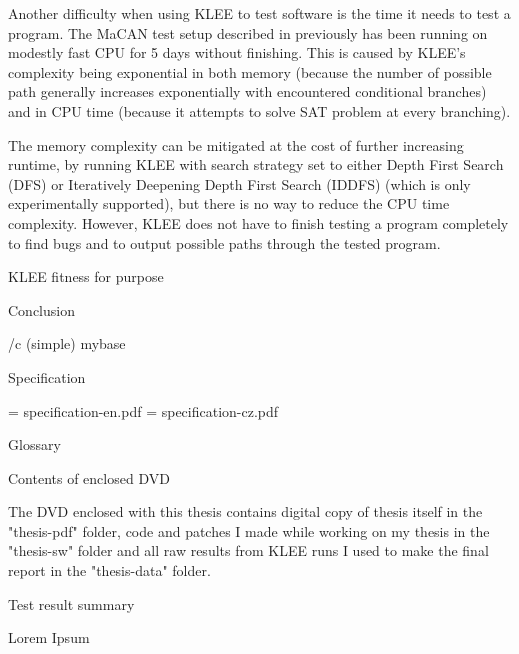 Another difficulty when using KLEE to test software is the time it needs to
test a program. The MaCAN test setup described in previously has been running
on modestly fast CPU for 5 days without finishing. This is caused by KLEE's
complexity being exponential in both memory (because the number of possible
path generally increases exponentially with encountered conditional branches)
and in CPU time (because it attempts to solve SAT problem at every branching).

The memory complexity can be mitigated at the cost of further increasing
runtime, by running KLEE with search strategy set to either Depth First Search
(DFS) or Iteratively Deepening Depth First Search (IDDFS) (which is only
experimentally supported), but there is no way to reduce the CPU time
complexity. However, KLEE does not have to finish testing a program completely
to find bugs and to output possible paths through the tested program.



\sec KLEE fitness for purpose




\chap Conclusion



\bibchap
\usebib/c (simple) mybase


\app Specification

\picw=\hsize
\cinspic specification-en.pdf
\vskip-2cm
\vfil\break
\picw=\hsize
\cinspic specification-cz.pdf
\nextoddpage


\app Glossary\par
\makeglos

\nextoddpage

\app Contents of enclosed DVD

The DVD enclosed with this thesis contains digital copy of thesis itself in the
"thesis-pdf" folder, code and patches I made while working on my thesis in the
"thesis-sw" folder and all raw results from KLEE runs I used to make the final
report in the "thesis-data" folder.

\nextoddpage

\app Test result summary

Lorem Ipsum

\bye

